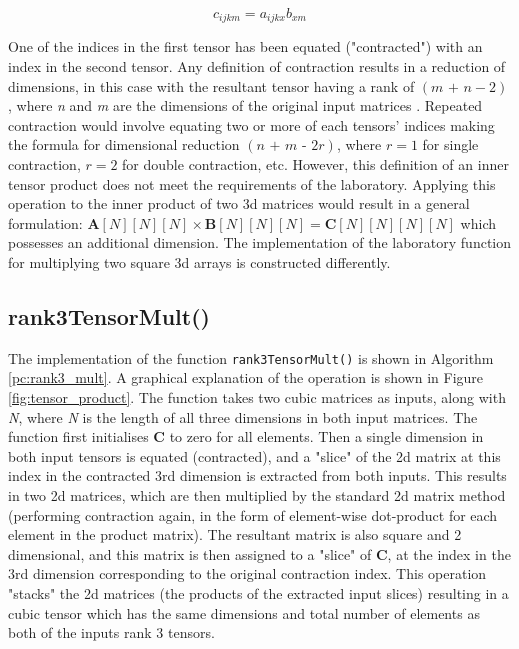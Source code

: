 \documentclass[10 pt, conference]{cssconf}
\begin{document}
\begin{equation}\label{eq:tensor_contraction_single}
    c_{ijkm} \mathrel{{=}} a_{ijkx}b_{xm}
\end{equation}%

One of the indices in the first tensor has been equated ("contracted") with an index in the second tensor. Any definition of contraction results in a reduction of dimensions, in this case with the resultant tensor having a rank of $(\textit{m + n}-2)$, where \textit{n} and \textit{m} are the dimensions of the original input matrices \cite{sochi2016introduction}.  Repeated contraction would involve equating two or more of each tensors' indices making the formula for dimensional reduction $(\textit{n + m - 2r})$, where $r=1$ for single contraction, $r=2$ for double contraction, etc. However, this definition of an inner tensor product does not meet the requirements of the laboratory. Applying this operation to the inner product of two 3d matrices would result in a general formulation: $\mathbf{A}[N][N][N] \times \mathbf{B}[N][N][N] \mathrel{=} \mathbf{C}[N][N][N][N]$ which possesses an additional dimension. The implementation of the laboratory function for multiplying two square 3d arrays is constructed differently.


\subsection{rank3TensorMult()}
The implementation of the function \verb|rank3TensorMult()| is shown in Algorithm \ref{pc:rank3_mult}. A graphical explanation of the operation is shown in Figure \ref{fig:tensor_product}. The function takes two cubic matrices as inputs, along with \textit{N}, where \textit{N} is the length of all three dimensions in both input matrices. The function first initialises $\mathbf{C}$ to zero for all elements. Then a single dimension in both input tensors is equated (contracted), and a "slice" of the 2d matrix at this index in the contracted 3rd dimension is extracted from both inputs. This results in two 2d matrices, which are then multiplied by the standard 2d matrix method (performing contraction again, in the form of element-wise dot-product for each element in the product matrix). The resultant matrix is also square and 2 dimensional, and this matrix is then assigned to a "slice" of $\mathbf{C}$, at the index in the 3rd dimension corresponding to the original contraction index. This operation "stacks" the 2d matrices (the products of the extracted input slices) resulting in a cubic tensor which has the same dimensions and total number of elements as both of the inputs rank 3 tensors.
\end{document}
